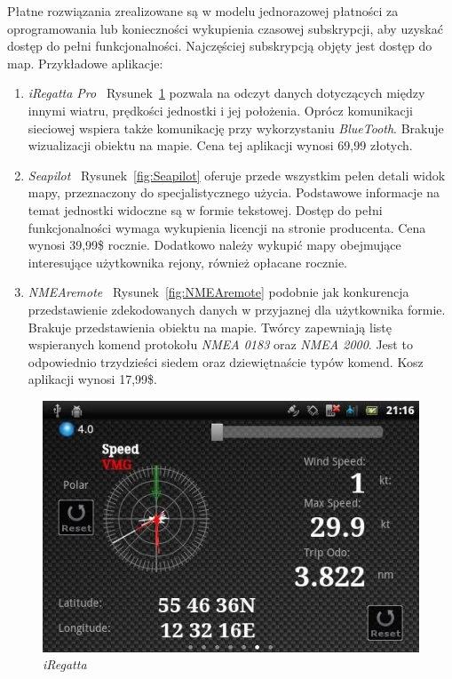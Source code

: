 \documentclass[skorowidz,skroty]{dyplomWEZUT}
\begin{document}
Płatne rozwiązania zrealizowane są w modelu jednorazowej płatności za oprogramowania lub konieczności wykupienia czasowej subskrypcji, aby uzyskać dostęp do pełni funkcjonalności. Najczęściej subskrypcją objęty jest dostęp do map. Przykładowe aplikacje:
\begin{enumerate}

\item \textit{iRegatta Pro} \cite{iRegatta} ~Rysunek~\ref{fig:iRegatta} pozwala na odczyt danych dotyczących między innymi wiatru, prędkości jednostki i jej położenia. Oprócz komunikacji sieciowej wspiera także komunikację przy wykorzystaniu \textit{BlueTooth}. Brakuje wizualizacji obiektu na mapie. Cena tej aplikacji wynosi 69,99 złotych.

\item \textit{Seapilot} \cite{Seapilot} ~Rysunek~\ref{fig:Seapilot} oferuje przede wszystkim pełen detali widok mapy, przeznaczony do specjalistycznego użycia. Podstawowe informacje na temat jednostki widoczne są w formie tekstowej. Dostęp do pełni funkcjonalności wymaga wykupienia licencji na stronie producenta. Cena wynosi 39,99\$ rocznie. Dodatkowo należy wykupić mapy obejmujące interesujące użytkownika rejony, również opłacane rocznie.

\item \textit{NMEAremote} \cite{NMEAremote} ~Rysunek~\ref{fig:NMEAremote} podobnie jak konkurencja przedstawienie zdekodowanych danych w przyjaznej dla użytkownika formie. Brakuje przedstawienia obiektu na mapie. Twórcy zapewniają listę wspieranych komend protokołu \textit{NMEA 0183} oraz \textit{NMEA 2000}. Jest to odpowiednio trzydzieści siedem oraz dziewiętnaście typów komend. Kosz aplikacji wynosi 17,99\$.  

\end{enumerate}

\begin{figure}[H]
  \centering
    \includegraphics[scale=1.0]{graphic/iRegatta}
    \caption{\textit{iRegatta}}
    \label{fig:iRegatta}
\end{figure}
\end{document}
